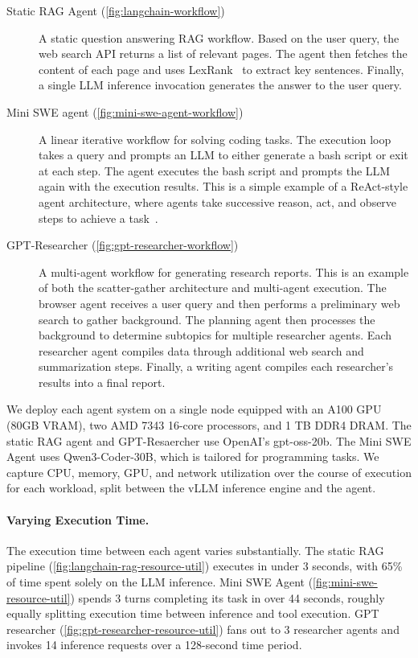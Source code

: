 \begin{description}
    \item[Static RAG Agent (\autoref{fig:langchain-workflow})]
    A static question answering RAG workflow\cite{raj2026understandinganalyzingoptimizingagenticcpucentric}.
    Based on the user query, the web search API returns a list of relevant pages.
    The agent then fetches the content of each page and uses LexRank~\cite{lexrank} to extract key sentences.
    Finally, a single LLM inference invocation generates the answer to the user query.
    \item[Mini SWE agent (\autoref{fig:mini-swe-agent-workflow})]
    A linear iterative workflow for solving coding tasks.
    The execution loop takes a query and prompts an LLM to either generate a bash script or exit at each step.
    The agent executes the bash script and prompts the LLM again with the execution results.
    This is a simple example of a ReAct-style agent architecture, where agents take successive reason, act, and observe steps to achieve a task~\cite{yao2023reactsynergizingreasoningacting}.
    \item[GPT-Researcher (\autoref{fig:gpt-researcher-workflow})]
    A multi-agent workflow for generating research reports.
    This is an example of both the scatter-gather architecture and multi-agent execution.
    The browser agent receives a user query and then performs a preliminary web search to gather background.
    The planning agent then processes the background to determine subtopics for multiple researcher agents.
    Each researcher agent compiles data through additional web search and summarization steps.
    Finally, a writing agent compiles each researcher's results into a final report.
\end{description}

We deploy each agent system on a single node equipped with an A100 GPU (80GB VRAM), two AMD 7343 16-core processors, and 1 TB DDR4 DRAM.
The static RAG agent and GPT-Resaercher use OpenAI's gpt-oss-20b.
The Mini SWE Agent uses Qwen3-Coder-30B, which is tailored for programming tasks.
We capture CPU, memory, GPU, and network utilization over the course of execution for each workload, split between the vLLM inference engine and the agent.

\paragraph{Varying Execution Time.}
The execution time between each agent varies substantially.
The static RAG pipeline (\autoref{fig:langchain-rag-resource-util}) executes in under 3 seconds, with 65\% of time spent solely on the LLM inference.
Mini SWE Agent (\autoref{fig:mini-swe-resource-util}) spends 3 turns completing its task in over 44 seconds, roughly equally splitting execution time between inference and tool execution.
GPT researcher (\autoref{fig:gpt-researcher-resource-util}) fans out to 3 researcher agents and invokes 14 inference requests over a 128-second time period.

